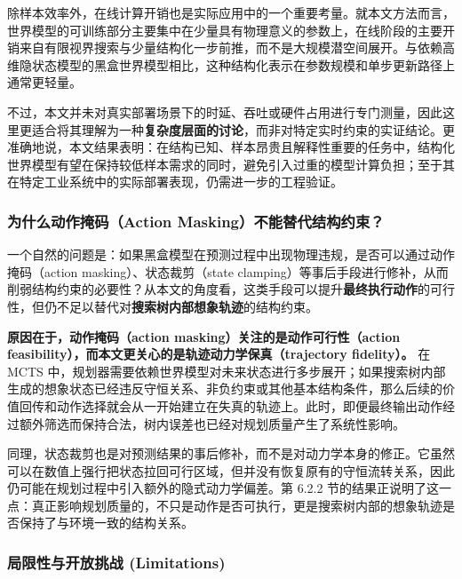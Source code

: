 \documentclass[UTF8]{ctexart}
\begin{document}
除样本效率外，在线计算开销也是实际应用中的一个重要考量。就本文方法而言，世界模型的可训练部分主要集中在少量具有物理意义的参数上，在线阶段的主要开销来自有限视界搜索与少量结构化一步前推，而不是大规模潜空间展开。与依赖高维隐状态模型的黑盒世界模型相比，这种结构化表示在参数规模和单步更新路径上通常更轻量。

不过，本文并未对真实部署场景下的时延、吞吐或硬件占用进行专门测量，因此这里更适合将其理解为一种\textbf{复杂度层面的讨论}，而非对特定实时约束的实证结论。更准确地说，本文结果表明：在结构已知、样本昂贵且解释性重要的任务中，结构化世界模型有望在保持较低样本需求的同时，避免引入过重的模型计算负担；至于其在特定工业系统中的实际部署表现，仍需进一步的工程验证。

\hypertarget{ux9884ux5148ux5e94ux5bf9ux53efux80fdux8d28ux7591ux4e3aux4ec0ux4e48-action-masking-ux4e0dux591fux7528}{%
\subsubsection{为什么动作掩码（Action Masking）不能替代结构约束？}\label{ux9884ux5148ux5e94ux5bf9ux53efux80fdux8d28ux7591ux4e3aux4ec0ux4e48-action-masking-ux4e0dux591fux7528}}

一个自然的问题是：如果黑盒模型在预测过程中出现物理违规，是否可以通过动作掩码（action masking）、状态裁剪（state clamping）等事后手段进行修补，从而削弱结构约束的必要性？从本文的角度看，这类手段可以提升\textbf{最终执行动作}的可行性，但仍不足以替代对\textbf{搜索树内部想象轨迹}的结构约束。

\textbf{原因在于，动作掩码（action masking）关注的是动作可行性（action feasibility），而本文更关心的是轨迹动力学保真（trajectory fidelity）。} 在 MCTS 中，规划器需要依赖世界模型对未来状态进行多步展开；如果搜索树内部生成的想象状态已经违反守恒关系、非负约束或其他基本结构条件，那么后续的价值回传和动作选择就会从一开始建立在失真的轨迹上。此时，即便最终输出动作经过额外筛选而保持合法，树内误差也已经对规划质量产生了系统性影响。

同理，状态裁剪也是对预测结果的事后修补，而不是对动力学本身的修正。它虽然可以在数值上强行把状态拉回可行区域，但并没有恢复原有的守恒流转关系，因此仍可能在规划过程中引入额外的隐式动力学偏差。第 6.2.2 节的结果正说明了这一点：真正影响规划质量的，不只是动作是否可执行，更是搜索树内部的想象轨迹是否保持了与环境一致的结构关系。

\hypertarget{ux5c40ux9650ux6027ux4e0eux5f00ux653eux6311ux6218-limitations}{%
\subsubsection{局限性与开放挑战
(Limitations)}\label{ux5c40ux9650ux6027ux4e0eux5f00ux653eux6311ux6218-limitations}}
\end{document}

